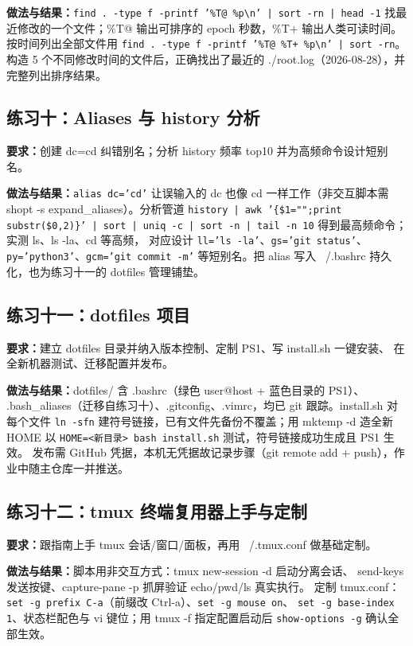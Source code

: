 \documentclass[UTF8]{ctexart}
\begin{document}
\noindent\textbf{做法与结果：}\texttt{find . -type f -printf '\%T@ \%p\textbackslash n' | sort -rn | head -1}
找最近修改的一个文件；\%T@ 输出可排序的 epoch 秒数，\%T+ 输出人类可读时间。
按时间列出全部文件用 \texttt{find . -type f -printf '\%T@ \%T+ \%p\textbackslash n' | sort -rn}。
构造 5 个不同修改时间的文件后，正确找出了最近的 ./root.log（2026-08-28），并完整列出排序结果。

\subsection{练习十：Aliases 与 history 分析}

\noindent\textbf{要求：}创建 dc=cd 纠错别名；分析 history 频率 top10 并为高频命令设计短别名。

\noindent\textbf{做法与结果：}\texttt{alias dc='cd'} 让误输入的 dc 也像 cd 一样工作（非交互脚本需
shopt -s expand\_aliases）。分析管道 \texttt{history | awk '\{\$1="";print substr(\$0,2)\}' |
sort | uniq -c | sort -n | tail -n 10} 得到最高频命令；实测 ls、ls -la、cd 等高频，
对应设计 \texttt{ll='ls -la'}、\texttt{gs='git status'}、\texttt{py='python3'}、\texttt{gcm='git commit -m'}
等短别名。把 alias 写入 ~/.bashrc 持久化，也为练习十一的 dotfiles 管理铺垫。

\subsection{练习十一：dotfiles 项目}

\noindent\textbf{要求：}建立 dotfiles 目录并纳入版本控制、定制 PS1、写 install.sh 一键安装、
在全新机器测试、迁移配置并发布。

\noindent\textbf{做法与结果：}dotfiles/ 含 .bashrc（绿色 user@host + 蓝色目录的 PS1）、
.bash\_aliases（迁移自练习十）、.gitconfig、.vimrc，均已 git 跟踪。install.sh 对每个文件
\texttt{ln -sfn} 建符号链接，已有文件先备份不覆盖；用 mktemp -d 造全新 HOME 以
\texttt{HOME=<新目录> bash install.sh} 测试，符号链接成功生成且 PS1 生效。
发布需 GitHub 凭据，本机无凭据故记录步骤（git remote add + push），作业中随主仓库一并推送。

\subsection{练习十二：tmux 终端复用器上手与定制}

\noindent\textbf{要求：}跟指南上手 tmux 会话/窗口/面板，再用 ~/.tmux.conf 做基础定制。

\noindent\textbf{做法与结果：}脚本用非交互方式：tmux new-session -d 启动分离会话、
send-keys 发送按键、capture-pane -p 抓屏验证 echo/pwd/ls 真实执行。
定制 tmux.conf：\texttt{set -g prefix C-a}（前缀改 Ctrl-a）、\texttt{set -g mouse on}、
\texttt{set -g base-index 1}、状态栏配色与 vi 键位；用 tmux -f 指定配置启动后
\texttt{show-options -g} 确认全部生效。
\end{document}

